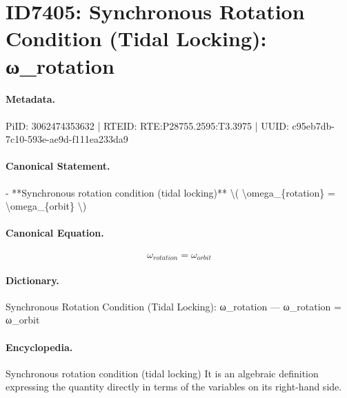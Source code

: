 \section*{ID7405: Synchronous Rotation Condition (Tidal Locking): ω\_rotation}
\paragraph{Metadata.}
PiID: 3062474353632 | RTEID: RTE:P28755.2595:T3.3975 | UUID: c95eb7db-7c10-593e-ae9d-f111ea233da9

\paragraph{Canonical Statement.}
- **Synchronous rotation condition (tidal locking)** \textbackslash{}( \textbackslash{}omega\_\{rotation\} = \textbackslash{}omega\_\{orbit\} \textbackslash{})

\paragraph{Canonical Equation.}
\[
\omega_{rotation} = \omega_{orbit}
\]

\paragraph{Dictionary.}
Synchronous Rotation Condition (Tidal Locking): ω\_rotation — ω\_rotation = ω\_orbit

\paragraph{Encyclopedia.}
Synchronous rotation condition (tidal locking) It is an algebraic definition expressing the quantity directly in terms of the variables on its right-hand side.
